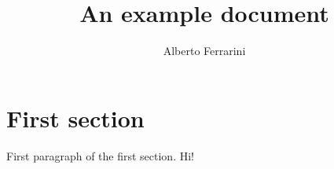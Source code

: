 \documentclass[a4paper]{article}
\begin{document}
\title{An example document}
\author{Alberto Ferrarini}
\maketitle{}

\section{First section}

First paragraph of the first section. Hi!
\end{document}
